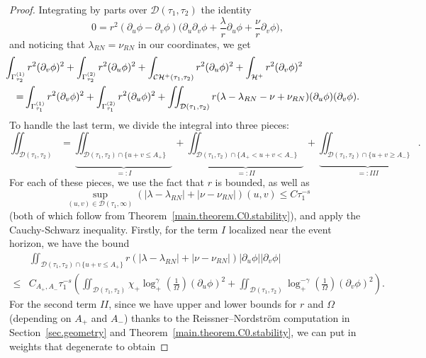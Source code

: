 \documentclass[10pt, reqno]{amsart}
\theoremstyle{definition}
\theoremstyle{remark}
\numberwithin{equation}{section}
\newcommand{\rd}{\partial}
\newcommand{\bb}{\Big}
\newcommand{\0}{\emptyset}
\newcommand{\Gmm}{\Gamma}
\newcommand{\lmb}{\lambda}
\newcommand{\Omg}{\Omega}
\newcommand{\calC}{\mathcal C}
\newcommand{\calD}{\mathcal D}
\newcommand{\calH}{\mathcal H}
\newcommand{\dur}{\nu}
\newcommand{\dvr}{\lmb}
\newcommand{\f}{\frac}
\newcommand{\CH}{\calC \calH^{+}}		%
\newcommand{\EH}{\calH^{+}}
\begin{document}
\begin{proof} 
Integrating by parts over $\calD(\tau_{1}, \tau_{2})$ the identity
\begin{equation*}
	0 = r^{2} (\rd_{u} \phi - \rd_{v} \phi) \bb( \rd_{u} \rd_{v} \phi + \frac{\dvr}{r} \rd_{u} \phi + \frac{\dur}{r} \rd_{v} \phi \bb),
\end{equation*} 
and noticing that $\dvr_{RN} = \dur_{RN}$ in our coordinates, we get
\begin{equation*} 
\begin{aligned}
&\hskip-2em
	\int_{\Gmm_{\tau_{2}}^{(1)}} r^{2} (\rd_{v} \phi)^{2} + \int_{\Gmm_{\tau_{2}}^{(2)}} r^{2} (\rd_{u} \phi)^{2} 
	+ \int_{\CH(\tau_{1}, \tau_{2})} r^{2} (\rd_{u} \phi)^{2} + \int_{\EH} r^{2} (\rd_{v} \phi)^{2} \\
	= &  \int_{\Gmm^{(1)}_{\tau_{1}}} r^{2} (\rd_{v} \phi)^{2} + \int_{\Gmm^{(2)}_{\tau_{1}}} r^{2} (\rd_{u} \phi)^{2} + \iint_{\calD(\tau_{1}, \tau_{2})} r(\dvr-\dvr_{RN}-\dur+\dur_{RN} )(\rd_u\phi)(\rd_v\phi).
\end{aligned}
\end{equation*}
To handle the last term, we divide the integral into three pieces:
$$\iint_{\calD(\tau_{1}, \tau_{2})}=\underbrace{\iint_{\calD(\tau_{1}, \tau_{2})\cap\{u+v\leq A_+\}}}_{=:I}+\underbrace{\iint_{\calD(\tau_{1}, \tau_{2})\cap\{A_+<u+v< A_-\}}}_{=:II}+\underbrace{\iint_{\calD(\tau_{1}, \tau_{2})\cap\{u+v\geq A_-\}}}_{=:III}.$$
For each of these pieces, we use the fact that $r$ is bounded, as well as
$$\sup_{(u,v)\in \calD(\tau_1,\infty)}\left(|\dvr-\dvr_{RN}|+|\dur-\dur_{RN}|\right)(u,v)\leq C\tau_1^{-s}$$
(both of which follow from Theorem~\ref{main.theorem.C0.stability}), and apply the Cauchy-Schwarz inequality. Firstly, for the term $I$ localized near the event horizon, we have the bound
\begin{equation*}
\begin{split}
&\iint_{\calD(\tau_{1}, \tau_{2})\cap\{u+v\leq A_+\}} r(|\dvr-\dvr_{RN}|+|\dur-\dur_{RN}| )|\rd_u\phi||\rd_v\phi|\\
\leq &C_{A_+,A_-}\tau_1^{-s}\left(\iint_{\calD(\tau_{1}, \tau_{2})} \chi_+\log_+^{\gamma}(\f{1}{\Omg})(\rd_u\phi)^2+\iint_{\calD(\tau_{1}, \tau_{2})} \log_+^{-\gamma}(\f{1}{\Omg})(\rd_v\phi)^2\right).
\end{split}
\end{equation*}
For the second term $II$, since we have upper and lower bounds for $r$ and $\Omg$ (depending on $A_+$ and $A_-$) thanks to the Reissner--Nordstr\"om computation in Section~\ref{sec.geometry} and Theorem~\ref{main.theorem.C0.stability}, we can put in weights that degenerate to obtain

\end{proof}
\end{document}
